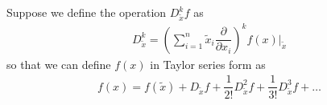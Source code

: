 %
Suppose we define the operation $D^k_{\tilde{x}}f$ as 
%
\begin{align}
	D^k_{\tilde{x}} = \left(\sum_{i=1}^{n} \tilde{x}_i \dfrac{\partial}{\partial x_i}\right)^k f(x) \bigg \rvert_{\tilde{x}}
\end{align}
%
so that we can define $f(x)$ in Taylor series form as 
%
\begin{align}
	f(x) = f(\tilde{x}) + D_{\tilde{x}} f + \dfrac{1}{2!} D^2_{\tilde{x}} f + \dfrac{1}{3!} D^3_{\tilde{x}} f + \ldots
\end{align}
%
